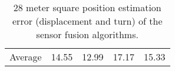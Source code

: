 \begin{table}[H]
\begin{center}
{\begin{tabular}[t]{lcccc}
                \hline
                Average          & 14.55                   & 12.99                  & 17.17           & 15.33
            \end{tabular}
        }
        \caption{28 meter square position estimation error (displacement and turn) of the sensor fusion algorithms. }
        \label{tab:28_square}
    \end{center}
\end{table}
